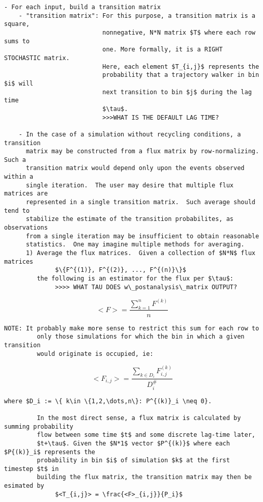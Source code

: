 \documentclass[10pt]{article}
\begin{document}
\begin{Verbatim}[commandchars=\\\{\},codes={\catcode`$=3\catcode`^=7\catcode`_=8}]
  - For each input, build a transition matrix 
    - "transition matrix": For this purpose, a transition matrix is a square,
                           nonnegative, N*N matrix $T$ where each row sums to 
                           one. More formally, it is a RIGHT STOCHASTIC matrix.  
                           Here, each element $T_{i,j}$ represents the 
                           probability that a trajectory walker in bin $i$ will
                           next transition to bin $j$ during the lag time 
                           $\tau$. 
                           >>>WHAT IS THE DEFAULT LAG TIME?

    - In the case of a simulation without recycling conditions, a transition
      matrix may be constructed from a flux matrix by row-normalizing. Such a
      transition matrix would depend only upon the events observed within a 
      single iteration.  The user may desire that multiple flux matrices are 
      represented in a single transition matrix.  Such average should tend to
      stabilize the estimate of the transition probabilites, as observations 
      from a single iteration may be insufficient to obtain reasonable
      statistics.  One may imagine multiple methods for averaging.
      1) Average the flux matrices.  Given a collection of $N*N$ flux matrices
              $\{F^{(1)}, F^{(2)}, ..., F^{(n)}\}$
         the following is an estimator for the flux per $\tau$:
              >>>> WHAT TAU DOES w\_postanalysis\_matrix OUTPUT?
\end{Verbatim}

              \[ <F> = \frac{\sum_{k=1}^{n} F^{(k)}}{n} \]

\begin{Verbatim}[commandchars=\\\{\},codes={\catcode`$=3\catcode`^=7\catcode`_=8}]
         NOTE: It probably make more sense to restrict this sum for each row to
         only those simulations for which the bin in which a given transition
         would originate is occupied, ie:
\end{Verbatim}

              \[ <F_{i,j}> = \frac{\sum_{k\in D_{i}} F^{(k)}_{i,j}}{D_{i}^\#} \]
        
\begin{Verbatim}[commandchars=\\\{\},codes={\catcode`$=3\catcode`^=7\catcode`_=8}]
         where $D_i := \{ k\in \{1,2,\dots,n\}: P^{(k)}_i \neq 0}.

         In the most direct sense, a flux matrix is calculated by summing probability 
         flow between some time $t$ and some discrete lag-time later, 
         $t+\tau$. Given the $N*1$ vector $P^{(k)}$ where each $P{(k)}_i$ represents the 
         probability in bin $i$ of simulation $k$ at the first timestep $t$ in 
         building the flux matrix, the transition matrix may then be esimated by 
              $<T_{i,j}> = \frac{<F>_{i,j}}{P_i}$
\end{Verbatim}
               
\end{document}
